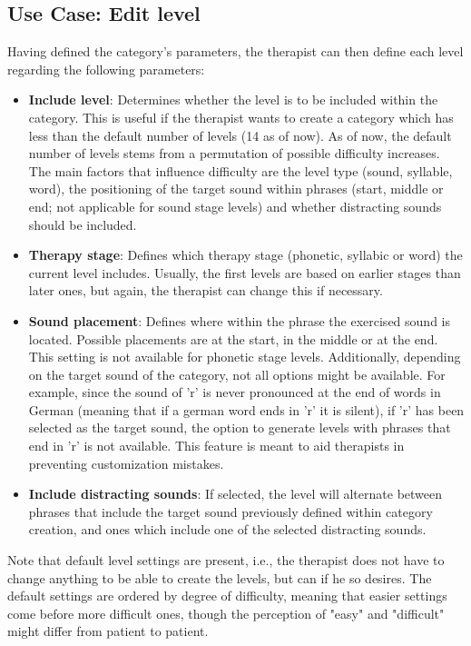 \documentclass[draft,final]{vutinfth} %
\begin{document}
\subsection{Use Case: Edit level}
Having defined the category's parameters, the therapist can then define each level regarding the following parameters:
\begin{itemize}
\item \textbf{Include level}: Determines whether the level is to be included within the category. This is useful if the therapist wants to create a category which has less than the default number of levels (14 as of now). As of now, the default number of levels stems from a permutation of possible difficulty increases. The main factors that influence difficulty are the level type (sound, syllable, word), the positioning of the target sound within phrases (start, middle or end; not applicable for sound stage levels) and whether distracting sounds should be included.
\item \textbf{Therapy stage}: Defines which therapy stage (phonetic, syllabic or word) the current level includes. Usually, the first levels are based on earlier stages than later ones, but again, the therapist can change this if necessary.
\item \textbf{Sound placement}: Defines where within the phrase the exercised sound is located. Possible placements are at the start, in the middle or at the end. This setting is not available for phonetic stage levels. Additionally, depending on the target sound of the category, not all options might be available. For example, since the sound of 'r' is never pronounced at the end of words in German (meaning that if a german word ends in 'r' it is silent), if 'r' has been selected as the target sound, the option to generate levels with phrases that end in 'r' is not available. This feature is meant to aid therapists in preventing customization mistakes.
\item \textbf{Include distracting sounds}: If selected, the level will alternate between phrases that include the target sound previously defined within category creation, and ones which include one of the selected distracting sounds.
\end{itemize}
Note that default level settings are present, i.e., the therapist does not have to change anything to be able to create the levels, but can if he so desires. The default settings are ordered by degree of difficulty, meaning that easier settings come before more difficult ones, though the perception of "easy" and "difficult" might differ from patient to patient.
\end{document}
